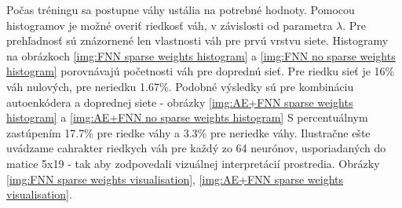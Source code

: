 \documentclass[10pt,a4paper]{article}
\begin{document}
Počas tréningu sa postupne váhy ustália na potrebné hodnoty. Pomocou histogramov
je možné overiť riedkosť váh, v závislosti od parametra $\lambda$.
Pre prehľadnosť sú znázornené len vlastnosti váh pre prvú vrstvu siete.
Histogramy na obrázkoch \ref{img:FNN sparse weights histogram} a \ref{img:FNN no sparse weights histogram}
porovnávajú početnosti váh pre doprednú sieť. Pre riedku sieť je 16\% váh nulových,
pre neriedku 1.67\%.
Podobné výsledky sú pre kombináciu autoenkódera a doprednej siete -
obrázky \ref{img:AE+FNN sparse weights histogram} a \ref{img:AE+FNN no sparse weights histogram}
S percentuálnym zastúpením 17.7\% pre riedke váhy a 3.3\% pre neriedke váhy.
Ilustračne ešte uvádzame cahrakter riedkych váh pre každý zo 64 neurónov, usporiadaných
do matice 5x19 - tak aby zodpovedali vizuálnej interpretácií prostredia. Obrázky
\ref{img:FNN sparse weights visualisation}, \ref{img:AE+FNN sparse weights visualisation}.
\end{document}
